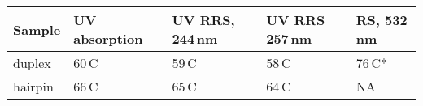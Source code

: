 \begin{tabular}{lllll}
\toprule
Sample  & UV absorption & UV RRS, 244\,nm & UV RRS 257\,nm & RS, 532\,nm \\
\midrule

duplex  & 60\,\textdegree{}C
                        & 59\,\textdegree{}C
												                  & 58\,\textdegree{}C
																					                 & 76\,\textdegree{}C* \\
hairpin & 66\,\textdegree{}C
                        & 65\,\textdegree{}C
												                  & 64\,\textdegree{}C
																					                 & NA \\

\bottomrule
\end{tabular}
